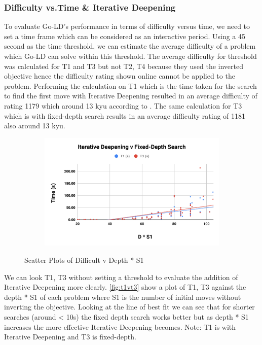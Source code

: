 \documentclass{l4proj}
\begin{document}
\subsubsection{Difficulty vs.Time \& Iterative Deepening}
To evaluate Go-LD's performance in terms of difficulty versus time, we need to set a time frame which can be considered as an interactive period. Using a 45 second as the time threshold, we can estimate the average difficulty of a problem which Go-LD can solve within this threshold. The average difficulty for threshold was calculated for T1 and T3 but not T2, T4 because they used the inverted objective hence the difficulty rating shown online cannot be applied to the problem. Performing the calculation on T1 which is the time taken for the search to find the first move with Iterative Deepening resulted in an average difficulty of rating 1179 which around 13 kyu according to \cite{GoProblems}. The same calculation for T3 which is with fixed-depth search results in an average difficulty rating of 1181 also around 13 kyu.

\begin{figure}[!h]
\centering
\begin{subfigure}[b]{\textwidth}
\centering
\includegraphics[width=\textwidth]{edvd/t1vt3.pdf}
\end{subfigure}
\caption{Scatter Plots of Difficult v Depth * S1}
\label{fig:t1vt3}
\end{figure}




We can look T1, T3 without setting a threshold to evaluate the addition of Iterative Deepening more clearly. \autoref{fig:t1vt3} show a plot of T1, T3 against the depth * S1 of each problem where S1 is the number of initial moves without inverting the objective. Looking at the line of best fit we can see that for shorter searches (around < 10s) the fixed depth search works better but as depth * S1 increases the more effective Iterative Deepening becomes. Note: T1 is with Iterative Deepening and T3 is fixed-depth.
\end{document}
